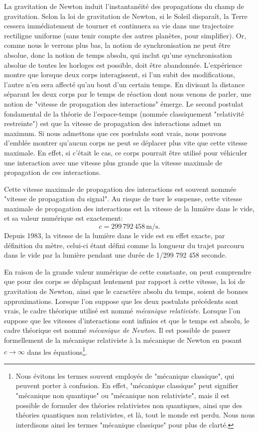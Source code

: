 		La gravitation de Newton induit l'instantanéité des propagations du champ de gravitation. Selon la loi de gravitation de Newton, si le Soleil disparaît, la Terre cessera immédiatement de tourner et continuera sa vie dans une trajectoire rectiligne uniforme (sans tenir compte des autres planètes, pour simplifier). Or, comme nous le verrons plus bas, la notion de synchronisation ne peut être absolue, donc la notion de temps absolu, qui inclut qu'une synchronisation absolue de toutes les horloges est possible, doit être abandonnée. L'expérience montre que lorsque deux corps interagissent, si l'un subit des modifications, l'autre n'en sera affecté qu'au bout d'un certain temps. En divisant la distance séparant les deux corps par le temps de réaction dont nous venons de parler, une notion de "vitesse de propagation des interactions" émerge. Le second postulat fondamental de la théorie de l'espace-temps (nommée classiquement "relativité restreinte") est que la vitesse de propagation des interactions admet un maximum. Si nous admettons que ces postulats sont vrais, nous pouvons d'emblée montrer qu'aucun corps ne peut se déplacer plus vite que cette vitesse maximale. En effet, si c'était le cas, ce corps pourrait être utilisé pour véhiculer une interaction avec une vitesse plus grande que la vitesse maximale de propagation de ces interactions. 

		Cette vitesse maximale de propagation des interactions est souvent nommée "vitesse de propagation du signal". Au risque de tuer le suspense, cette vitesse maximale de propagation des interactions est la vitesse de la lumière dans le vide, et sa valeur numérique est exactement:
		\begin{equation}
			c=299\, 792\, 458\, \mathrm{m}/\mathrm{s}.
		\end{equation}
		Depuis 1983, la vitesse de la lumière dans le vide est en effet exacte, par définition du mètre, celui-ci étant défini comme la longueur du trajet parcouru dans le vide par la lumière pendant une durée de 1/299 792 458 seconde. 

		En raison de la grande valeur numérique de cette constante, on peut comprendre que pour des corps se déplaçant lentement par rapport à cette vitesse, la loi de gravitation de Newton, ainsi que le caractère absolu du temps, soient de bonnes approximations. Lorsque l'on suppose que les deux postulats précédents sont vrais, le cadre théorique utilisé est nommé \emph{mécanique relativiste}. Lorsque l'on suppose que les vitesses d'interactions sont infinies et que le temps est absolu, le cadre théorique est nommé \emph{mécanique de Newton}. Il est possible de passer formellement de la mécanique relativiste à la mécanique de Newton en posant $c\rightarrow\infty$ dans les équations\footnote{Nous évitons les termes souvent employés de "mécanique classique", qui peuvent porter à confusion. En effet, "mécanique classique" peut signifier "mécanique non quantique" ou "mécanique non relativiste", mais il est possible de formuler des théories relativistes non quantiques, ainsi que des théories quantiques non relativistes, et là, tout le monde est perdu. Nous nous interdisons ainsi les termes "mécanique classique" pour plus de clarté.}. 

